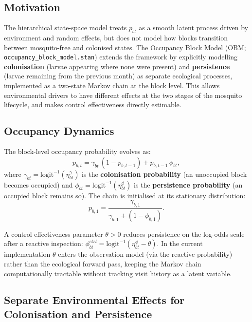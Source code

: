 \documentclass[12pt,a4paper]{article}
\begin{document}
\subsection{Motivation}

The hierarchical state-space model treats $p_{bt}$ as a smooth latent process driven by environment and random effects, but does not model how blocks transition between mosquito-free and colonised states. The Occupancy Block Model (OBM; \texttt{occupancy\_block\_model.stan}) extends the framework by explicitly modelling \textbf{colonisation} (larvae appearing where none were present) and \textbf{persistence} (larvae remaining from the previous month) as separate ecological processes, implemented as a two-state Markov chain at the block level. This allows environmental drivers to have different effects at the two stages of the mosquito lifecycle, and makes control effectiveness directly estimable.

\subsection{Occupancy Dynamics}

The block-level occupancy probability evolves as:
\begin{equation}
p_{b,t} = \gamma_{bt}\,(1 - p_{b,t-1}) + p_{b,t-1}\,\phi_{bt},
\end{equation}
where $\gamma_{bt} = \text{logit}^{-1}(\eta_{bt}^\gamma)$ is the \textbf{colonisation probability} (an unoccupied block becomes occupied) and $\phi_{bt} = \text{logit}^{-1}(\eta_{bt}^\phi)$ is the \textbf{persistence probability} (an occupied block remains so). The chain is initialised at its stationary distribution:
\begin{equation}
p_{b,1} = \frac{\gamma_{b,1}}{\gamma_{b,1} + (1 - \phi_{b,1})}.
\end{equation}

A control effectiveness parameter $\theta > 0$ reduces persistence on the log-odds scale after a reactive inspection: $\phi_{bt}^{ctrl} = \text{logit}^{-1}(\eta_{bt}^\phi - \theta)$. In the current implementation $\theta$ enters the observation model (via the reactive probability) rather than the ecological forward pass, keeping the Markov chain computationally tractable without tracking visit history as a latent variable.

\subsection{Separate Environmental Effects for Colonisation and Persistence}
\end{document}
